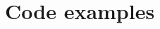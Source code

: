 \documentclass{acm_proc_article-sp}
\begin{document}


\appendix

\nocite{*}
%
%
\appendix



\section{Code examples}
\end{document}
